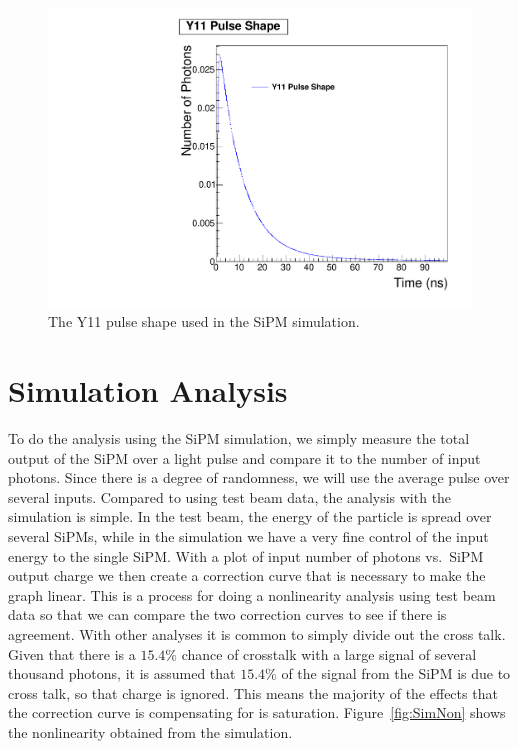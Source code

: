\begin{figure}
\centering
\includegraphics[width=0.8\linewidth]{Figures/Y11.pdf}
\caption{The Y11 pulse shape used in the SiPM simulation.}
\label{fig:Y11}
\end{figure}

\section{Simulation Analysis}

To do the analysis using the SiPM simulation, we simply measure the total output of the SiPM over a light pulse and compare it to the number of input photons. Since there is a degree of randomness, we will use the average pulse over several inputs. Compared to using test beam data, the analysis with the simulation is simple. In the test beam, the energy of the particle is spread over several SiPMs, while in the simulation we have a very fine control of the input energy to the single SiPM. With a plot of input number of photons vs.\ SiPM output charge we then create a correction curve that is necessary to make the graph linear. This is a process for doing a nonlinearity analysis using test beam data so that we can compare the two correction curves to see if there is agreement. With other analyses it is common to simply divide out the cross talk. Given that there is a $15.4\%$ chance of crosstalk with a large signal of several thousand photons, it is assumed that $15.4\%$ of the signal from the SiPM is due to cross talk, so that charge is ignored. This means the majority of the effects that the correction curve is compensating for is saturation. Figure~\ref{fig:SimNon} shows the nonlinearity obtained from the simulation.

